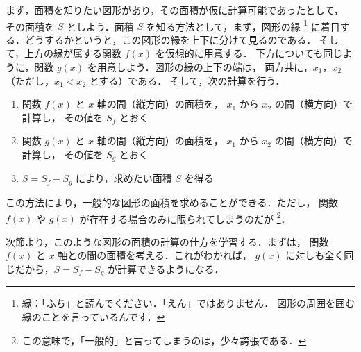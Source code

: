                 まず，面積を知りたい図形があり，その面積が仮に計算可能であったとして，
                その面積を $S$ としよう．面積 $S$ を知る方法として，まず，図形の縁
                    \footnote{
                        縁：「ふち」と読んでください．「えん」ではありません．
                        図形の周囲を囲む縁のことを言っているんです．
                    }
                に着目する．どうするかというと，この図形の縁を上下に分けて見るのである．
                そして，上方の縁が属する関数 $f(x)$ を仮想的に用意する．
                下方についても同じように，関数 $g(x)$ を用意しよう．図形の縁の上下の端は，
                両方共に，$x_{1}$，$x_{2}$（ただし，$x_{1}<x_{2}$ とする）である．
                そして，次の計算を行う．
                    \begin{enumerate}
                        \item 関数 $f(x)$ と $x$ 軸の間（縦方向）の面積を，
                              $x_{1}$ から $x_{2}$ の間（横方向）で計算し，
                              その値を $S_{f}$ とおく
                        \item 関数 $g(x)$ と $x$ 軸の間（縦方向）の面積を，
                              $x_{1}$ から $x_{2}$ の間（横方向）で計算し，
                              その値を $S_{g}$ とおく
                        \item $S=S_{f}-S_{g}$ により，求めたい面積 $S$ を得る
                    \end{enumerate}


                この方法により，一般的な図形の面積を求めることができる．ただし，
                関数 $f(x)$ や $g(x)$ が存在する場合のみに限られてしまうのだが
                    \footnote{
                        この意味で，「一般的」と言ってしまうのは，少々誇張である．
                    }．

                次節より，このような図形の面積の計算の仕方を学習する．まずは，
                関数 $f(x)$ と $x$ 軸との間の面積を考える．これがわかれば，
                $g(x)$ に対しも全く同じだから，$S=S_{f}-S_{g}$ が計算できるようになる．

